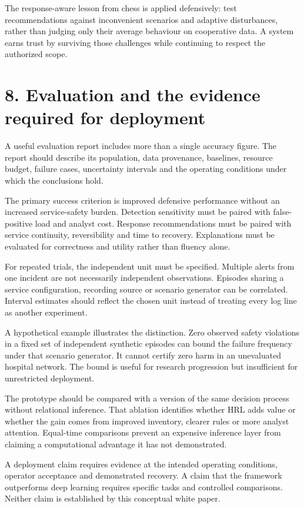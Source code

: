 \documentclass[11pt]{article}
\begin{document}
The response-aware lesson from chess is applied defensively: test recommendations against inconvenient scenarios and adaptive disturbances, rather than judging only their average behaviour on cooperative data. A system earns trust by surviving those challenges while continuing to respect the authorized scope.

\clearpage
\section*{8. Evaluation and the evidence required for deployment}
A useful evaluation report includes more than a single accuracy figure. The report should describe its population, data provenance, baselines, resource budget, failure cases, uncertainty intervals and the operating conditions under which the conclusions hold.

The primary success criterion is improved defensive performance without an increased service-safety burden. Detection sensitivity must be paired with false-positive load and analyst cost. Response recommendations must be paired with service continuity, reversibility and time to recovery. Explanations must be evaluated for correctness and utility rather than fluency alone.

For repeated trials, the independent unit must be specified. Multiple alerts from one incident are not necessarily independent observations. Episodes sharing a service configuration, recording source or scenario generator can be correlated. Interval estimates should reflect the chosen unit instead of treating every log line as another experiment.

A hypothetical example illustrates the distinction. Zero observed safety violations in a fixed set of independent synthetic episodes can bound the failure frequency under that scenario generator. It cannot certify zero harm in an unevaluated hospital network. The bound is useful for research progression but insufficient for unrestricted deployment.

The prototype should be compared with a version of the same decision process without relational inference. That ablation identifies whether HRL adds value or whether the gain comes from improved inventory, clearer rules or more analyst attention. Equal-time comparisons prevent an expensive inference layer from claiming a computational advantage it has not demonstrated.

A deployment claim requires evidence at the intended operating conditions, operator acceptance and demonstrated recovery. A claim that the framework outperforms deep learning requires specific tasks and controlled comparisons. Neither claim is established by this conceptual white paper.
\end{document}
